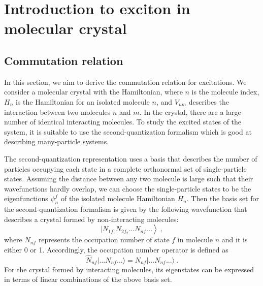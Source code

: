 \section{Introduction to exciton in molecular crystal}
\label{sec: exciton}

\subsection{Commutation relation}
\label{sec:commutationRelation}
In this section, we aim to derive the commutation relation for excitations. We consider a molecular crystal with the Hamiltonian,
where $n$ is the molecule index, $H_{n}$ is the Hamiltonian for an isolated molecule $n$, and $V_{nm}$ describes 
the interaction between two molecules $n$ and $m$.
In the crystal, there are a large number of identical interacting molecules. To study the excited states of the system, 
it is suitable to use the second-quantization formalism which is good at describing many-particle systems. 


The second-quantization representation uses a basis that describes the number of particles occupying each state in a complete orthonormal set of single-particle states. Assuming the distance between any two molecule is large such that their wavefunctions hardly overlap, we can choose the single-particle states  to be the eigenfunctions $\psi^f_n$ of the isolated molecule Hamiltonian $H_n$.  Then the basis set for the second-quantization formalism is  
given by the following wavefunction that describes a crystal formed by non-interacting molecules:
\begin{equation}
\left. |N_{1f_{1}} N_{2f_{2}} ...N_{nf} ... \right\rangle \nonumber \ , 
\end{equation}
where $N_{nf}$ represents the occupation number of state $f$ in molecule $n$ and it is either 0 or 1. Accordingly, 
the occupation number operator is defined as
\begin{equation}
\hat{N}_{nf} |...N_{nf}...\rangle = N_{nf} |...N_{nf}...\rangle \ .
\end{equation}
For the crystal formed by interacting molecules, its eigenstates can be expressed in terms of linear combinations
of the above basis set. 

